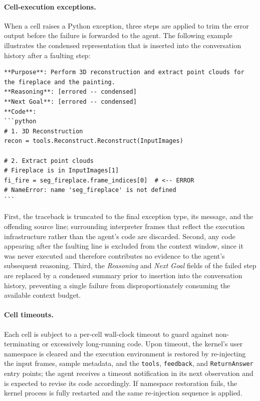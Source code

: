 \paragraph{Cell-execution exceptions.}
When a cell raises a Python exception, three steps are applied to trim the error output before the failure is forwarded to the agent.
The following example illustrates the condensed representation that is inserted into the conversation history after a faulting step:
\begin{lstlisting}[style=promptStyle]
**Purpose**: Perform 3D reconstruction and extract point clouds for the fireplace and the painting.
**Reasoning**: [errored -- condensed]
**Next Goal**: [errored -- condensed]
**Code**:
```python
# 1. 3D Reconstruction
recon = tools.Reconstruct.Reconstruct(InputImages)

# 2. Extract point clouds
# Fireplace is in InputImages[1]
fi_fire = seg_fireplace.frame_indices[0]  # <-- ERROR
# NameError: name 'seg_fireplace' is not defined
```
\end{lstlisting} 
First, the traceback is truncated to the final exception type, its message, and the offending source line; surrounding interpreter frames that reflect the execution infrastructure rather than the agent's code are discarded. Second, any code appearing after the faulting line is excluded from the context window, since it was never executed and therefore contributes no evidence to the agent's subsequent reasoning. Third, the \emph{Reasoning} and \emph{Next Goal} fields of the failed step are replaced by a condensed summary prior to insertion into the conversation history, preventing a single failure from disproportionately consuming the available context budget.

\paragraph{Cell timeouts.}
Each cell is subject to a per-cell wall-clock timeout to guard against non-terminating or excessively long-running code. Upon timeout, the kernel's user namespace is cleared and the execution environment is restored by re-injecting the input frames, sample metadata, and the \texttt{tools}, \texttt{feedback}, and \texttt{ReturnAnswer} entry points; the agent receives a timeout notification in its next observation and is expected to revise its code accordingly. If namespace restoration fails, the kernel process is fully restarted and the same re-injection sequence is applied.

